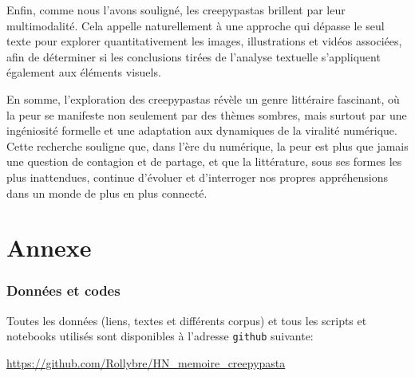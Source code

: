 \documentclass[12pt,a4paper,oneside,titlepage]{book} %
\begin{document}
Enfin, comme nous l'avons souligné, les creepypastas brillent par leur multimodalité. Cela appelle naturellement à une approche qui dépasse le seul texte pour explorer quantitativement les images, illustrations et vidéos associées, afin de déterminer si les conclusions tirées de l'analyse textuelle s'appliquent également aux éléments visuels.

En somme, l'exploration des creepypastas révèle un genre littéraire fascinant, où la peur se manifeste non seulement par des thèmes sombres, mais surtout par une ingéniosité formelle et une adaptation aux dynamiques de la viralité numérique. Cette recherche souligne que, dans l'ère du numérique, la peur est plus que jamais une question de contagion et de partage, et que la littérature, sous ses formes les plus inattendues, continue d'évoluer et d'interroger nos propres appréhensions dans un monde de plus en plus connecté.

\newpage
\listoffigures
{}
\listoftables
{}

\appendix
	\part*{Annexe}
	\section*{Données et codes}
	Toutes les données (liens, textes et différents corpus) et tous les scripts et notebooks utilisés sont disponibles à l'adresse \texttt{github} suivante: 
	
	\begin{centering}
		\url{https://github.com/Rollybre/HN_memoire_creepypasta}
	\end{centering}
	\bigskip\\
\end{document}
